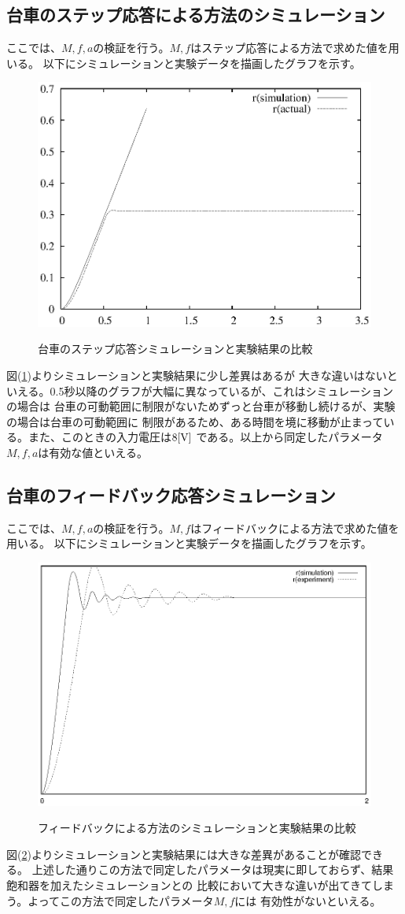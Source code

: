 	\subsection{台車のステップ応答による方法のシミュレーション}
		ここでは、$M,f,a$の検証を行う。$M,f$はステップ応答による方法で求めた値を用いる。
		以下にシミュレーションと実験データを描画したグラフを示す。
		\begin{figure}[H]
			\centering
			\includegraphics[width=0.5\linewidth]{gazo/nabe8.eps}\\
			\caption{台車のステップ応答シミュレーションと実験結果の比較}
			\label{image:step}
		\end{figure}
		図(\ref{image:step})よりシミュレーションと実験結果に少し差異はあるが
		大きな違いはないといえる。0.5秒以降のグラフが大幅に異なっているが、これはシミュレーションの場合は
		台車の可動範囲に制限がないためずっと台車が移動し続けるが、実験の場合は台車の可動範囲に
		制限があるため、ある時間を境に移動が止まっている。また、このときの入力電圧は$8[\rm{V}]$
		である。以上から同定したパラメータ$M,f,a$は有効な値といえる。
	\subsection{台車のフィードバック応答シミュレーション}
		ここでは、$M,f,a$の検証を行う。$M,f$はフィードバックによる方法で求めた値を用いる。
		以下にシミュレーションと実験データを描画したグラフを示す。
		\begin{figure}[H]
			\centering
			\includegraphics[width=0.5\linewidth]{gazo/feedbackExperiment.eps}\\
			\caption{フィードバックによる方法のシミュレーションと実験結果の比較}
			\label{image:feedback}
		\end{figure}
		図(\ref{image:feedback})よりシミュレーションと実験結果には大きな差異があることが確認できる。
		上述した通りこの方法で同定したパラメータは現実に即しておらず、結果飽和器を加えたシミュレーションとの
		比較において大きな違いが出てきてしまう。よってこの方法で同定したパラメータ$M,f$には
		有効性がないといえる。
		

